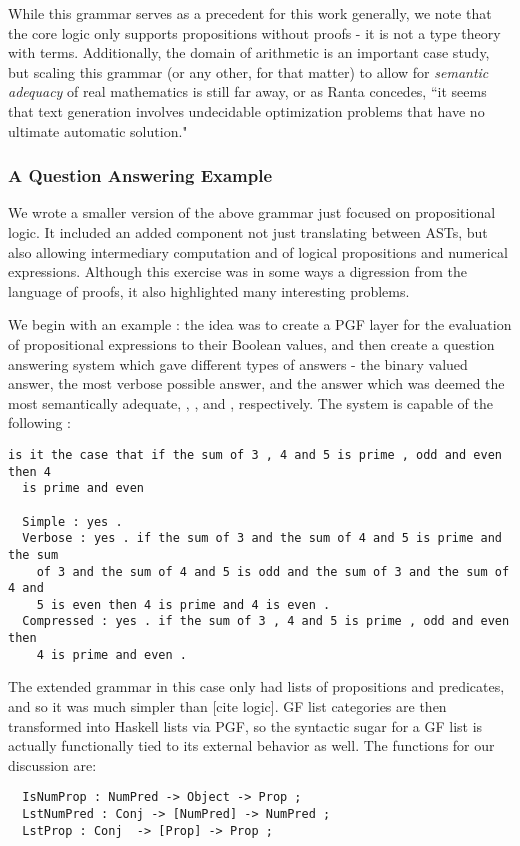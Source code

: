 While this grammar serves as a precedent for this work generally, we note that
the core logic only supports propositions without proofs - it is not a type
theory with terms. Additionally, the domain of arithmetic is an important case
study, but scaling this grammar (or any other, for that matter) to allow for
\emph{semantic adequacy} of real mathematics is still far away, or as Ranta
concedes, ``it seems that text generation involves undecidable optimization
problems that have no ultimate automatic solution."

\subsubsection{A Question Answering Example}


We wrote a smaller version of the above grammar \cite{warrickCub} just focused on
propositional logic. It included an added component not just translating between
ASTs, but also allowing intermediary computation and of logical
propositions and numerical expressions. Although this exercise was in some ways
a digression from the language of proofs, it also highlighted many interesting
problems.

We begin with an example : the idea was to create a PGF layer for the evaluation
of propositional expressions to their Boolean values, and then create a question
answering system which gave different types of answers - the binary valued
answer, the most verbose possible answer, and the answer which was deemed the
most semantically adequate, , , and
, respectively. The system is capable of the following :
\begin{verbatim}
is it the case that if the sum of 3 , 4 and 5 is prime , odd and even then 4
  is prime and even

  Simple : yes .
  Verbose : yes . if the sum of 3 and the sum of 4 and 5 is prime and the sum
    of 3 and the sum of 4 and 5 is odd and the sum of 3 and the sum of 4 and
    5 is even then 4 is prime and 4 is even .
  Compressed : yes . if the sum of 3 , 4 and 5 is prime , odd and even then
    4 is prime and even .
\end{verbatim}

The extended grammar in this case only had lists of propositions and predicates,
and so it was much simpler than [cite logic]. GF list categories are then
transformed into Haskell lists via PGF, so the syntactic sugar for a GF list is actually
functionally tied to its external behavior as well. The functions for our
discussion are:
\begin{verbatim}
  IsNumProp : NumPred -> Object -> Prop ;
  LstNumPred : Conj -> [NumPred] -> NumPred ;
  LstProp : Conj  -> [Prop] -> Prop ;
\end{verbatim}

